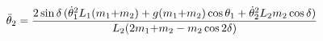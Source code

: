 \documentclass[preview]{standalone}
\begin{document}
\begin{align*}
\special{dvisvgm:raw <g id='unique000'>}\ddot\theta_2 = \frac{2\sin\delta\,(\dot\theta_1^2 L_1(m_1{+}m_2)+ g(m_1{+}m_2)\cos\theta_1+ \dot\theta_2^2 L_2 m_2 \cos\delta)}{L_2(2m_1{+}m_2 - m_2\cos 2\delta)}\special{dvisvgm:raw </g>}
\end{align*}
\end{document}
